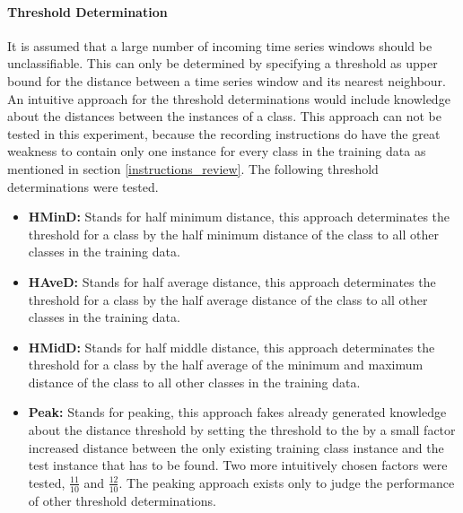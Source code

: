 \paragraph{Threshold Determination} \label{threshold_determination}
It is assumed that a large number of incoming time series windows should be unclassifiable. This can only be determined
by specifying a threshold as upper bound for the distance between a time series window and its nearest neighbour. An
intuitive approach for the threshold determinations would include knowledge about the distances between the instances of
a class. This approach can not be tested in this experiment, because the recording instructions do have the great weakness
to contain only one instance for every class in the training data as mentioned in section \ref{instructions_review}. The
following threshold determinations were tested.

\begin{itemize}
    \item \textbf{HMinD:} Stands for half minimum distance, this approach determinates the threshold for a class by the
        half minimum distance of the class to all other classes in the training data.
    \item \textbf{HAveD:} Stands for half average distance, this approach determinates the threshold for a class by the
        half average distance of the class to all other classes in the training data.
    \item \textbf{HMidD:} Stands for half middle distance, this approach determinates the threshold for a class by the
        half average of the minimum and maximum distance of the class to all other classes in the training data.
    \item \textbf{Peak:} Stands for peaking, this approach fakes already generated knowledge about the distance
        threshold by setting the threshold to the by a small factor increased distance between the only existing
        training class instance and the test instance that has to be found. Two more intuitively chosen factors were
        tested, $\frac{11}{10}$ and $\frac{12}{10}$. The peaking approach exists only to judge the performance of other
        threshold determinations.
\end{itemize}
